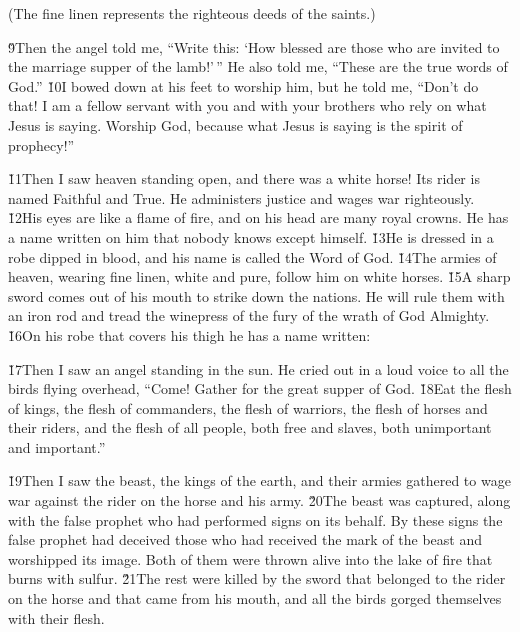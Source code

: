 (The fine linen represents the righteous deeds of the saints.)

\v{9}Then the angel told me, ``Write this: `How blessed are those who are invited to the marriage supper of the lamb!'\,'' He also told me, ``These are the true words of God.'' \v{10}I bowed down at his feet to worship him, but he told me, ``Don't do that! I am a fellow servant with you and with your brothers who rely on what Jesus is saying. Worship God, because what Jesus is saying is the spirit of prophecy!''

\v{11}Then I saw heaven standing open, and there was a white horse! Its rider is named Faithful and True. He administers justice and wages war righteously. \v{12}His eyes are like a flame of fire, and on his head are many royal crowns. He has a name written on him that nobody knows except himself. \v{13}He is dressed in a robe dipped in blood, and his name is called the Word of God. \v{14}The armies of heaven, wearing fine linen, white and pure, follow him on white horses. \v{15}A sharp sword comes out of his mouth to strike down the nations. He will rule them with an iron rod and tread the winepress of the fury of the wrath of God Almighty. \v{16}On his robe that covers his thigh he has a name written:


\v{17}Then I saw an angel standing in the sun. He cried out in a loud voice to all the birds flying overhead, ``Come! Gather for the great supper of God. \v{18}Eat the flesh of kings, the flesh of commanders, the flesh of warriors, the flesh of horses and their riders, and the flesh of all people, both free and slaves, both unimportant and important.''

\v{19}Then I saw the beast, the kings of the earth, and their armies gathered to wage war against the rider on the horse and his army. \v{20}The beast was captured, along with the false prophet who had performed signs on its behalf. By these signs the false prophet had deceived those who had received the mark of the beast and worshipped its image. Both of them were thrown alive into the lake of fire that burns with sulfur. \v{21}The rest were killed by the sword that belonged to the rider on the horse and that came from his mouth, and all the birds gorged themselves with their flesh.

